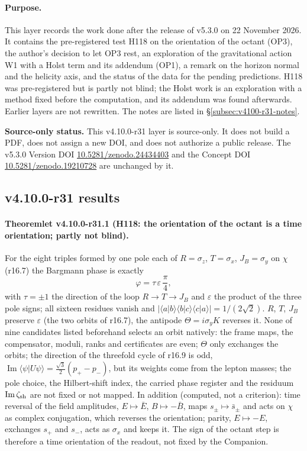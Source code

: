 \paragraph{Purpose.}
This layer records the work done after the release of v5.3.0 on 22 November 2026.  It contains the pre-registered test H118 on the
orientation of the octant (OP3), the author's decision to let OP3 rest, an exploration of the gravitational action W1 with a Holst
term and its addendum (OP1), a remark on the horizon normal and the helicity axis, and the status of the data for the pending
predictions.  H118 was pre-registered but is partly not blind; the Holst work is an exploration with a method fixed before the
computation, and its addendum was found afterwards.  Earlier layers are not rewritten.  The notes are listed in
\S\ref{subsec:v4100-r31-notes}.

\noindent\textbf{Source-only status.}
This v4.10.0-r31 layer is source-only.  It does not build a PDF, does not assign a new DOI,
and does not authorize a public release.  The v5.3.0 Version DOI
\href{https://doi.org/10.5281/zenodo.24434403}{10.5281/zenodo.24434403} and the Concept DOI
\href{https://doi.org/10.5281/zenodo.19210728}{10.5281/zenodo.19210728} are unchanged by it.

\subsection*{v4.10.0-r31 results}
\label{subsec:v4100-r31-results}

\paragraph{Theoremlet v4.10.0-r31.1 (H118: the orientation of the octant is a time orientation; partly not blind).}
For the eight triples formed by one pole each of \(R=\sigma_z\), \(T=\sigma_x\), \(J_B=\sigma_y\) on \(\chi\) (r16.7) the Bargmann phase is exactly
\[
\varphi=\tau\,\varepsilon\,\frac{\pi}{4},
\]
with \(\tau=\pm1\) the direction of the loop \(R\to T\to J_B\) and \(\varepsilon\) the product of the three pole signs; all sixteen residues
vanish and \(|\langle a|b\rangle\langle b|c\rangle\langle c|a\rangle|=1/(2\sqrt2)\).  \(R\), \(T\), \(J_B\) preserve \(\varepsilon\) (the two orbits of r16.7), the
antipode \(\Theta=i\sigma_yK\) reverses it.  None of nine candidates listed beforehand selects an orbit natively: the frame maps, the
compensator, moduli, ranks and certificates are even; \(\Theta\) only exchanges the orbits; the direction of the threefold cycle of r16.9
is odd, \(\operatorname{Im}\langle\psi|U\psi\rangle=\tfrac{\sqrt3}{2}(p_+-p_-)\), but its weights come from the lepton masses; the pole choice,
the Hilbert-shift index, the carried phase register and the residuum \(\operatorname{Im}\zeta_{\rm sh}\) are not fixed or not mapped.  In
addition (computed, not a criterion): time reversal of the field amplitudes, \(E\mapsto\bar E\), \(B\mapsto-\bar B\), maps \(s_\pm\mapsto\bar s_\pm\)
and acts on \(\chi\) as complex conjugation, which reverses the orientation; parity, \(E\mapsto-E\), exchanges \(s_+\) and \(s_-\), acts as
\(\sigma_x\) and keeps it.  The sign of the octant step is therefore a time orientation of the readout, not fixed by the Companion.


